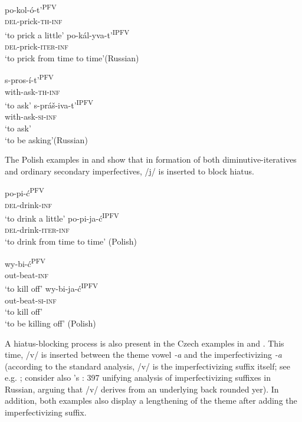 \documentclass[output=paper,colorlinks,citecolor=brown]{langscibook}
\begin{document}
\ea\label{biskup:ex:dimin-rus1}\ea\gll po-kol-ó-t'\textsuperscript{PFV}\\
\textsc{del}-prick-\textsc{th-inf}\\
\glt ‘to prick a little’ \label{biskup:ex:dimin-rus1.a}
\ex\gll po-kál-yva-t'\textsuperscript{IPFV}\\
\textsc{del}-prick-\textsc{iter-inf}\\
\glt ‘to prick from time to time’\hfill (Russian)\label{biskup:ex:dimin-rus1.b}
\z\z

\ea\label{biskup:ex:dimin-rus2}\ea\gll s-pros-í-t'\textsuperscript{PFV}\\
with-ask-\textsc{th-inf}\\
\glt ‘to ask’ \label{biskup:ex:dimin-rus2.a}
\ex\gll s-práš-iva-t'\textsuperscript{IPFV}\\
with-ask-\textsc{si-inf}\\
\glt ‘to ask’\\‘to be asking’\hfill (Russian)\label{biskup:ex:dimin-rus2.b}
\z\z

\noindent The Polish examples in  and  show that in formation of both diminutive-iteratives and ordinary secondary imperfectives, /j/ is inserted to block hiatus.

\ea\label{biskup:ex:dimin-pol1}\ea\gll po-pi-ć\textsuperscript{PFV}\\
\textsc{del}-drink-\textsc{inf}\\
\glt ‘to drink a little’ \label{biskup:ex:dimin-pol1.a}
\ex\gll po-pi-ja-ć\textsuperscript{IPFV}\\
\textsc{del}-drink-\textsc{iter-inf}\\
\glt ‘to drink from time to time’ \hfill (Polish) \label{biskup:ex:pol1.b}
\z\z

\ea\label{biskup:ex:dimin-pol2}\ea\gll wy-bi-ć\textsuperscript{PFV}\\
out-beat-\textsc{inf}\\
\glt ‘to kill off’ \label{biskup:ex:dimin-pol2.a}
\ex\gll wy-bi-ja-ć\textsuperscript{IPFV}\\
out-beat-\textsc{si-inf}\\
\glt ‘to kill off’ \\ ‘to be killing off’ \hfill (Polish) \label{biskup:ex:dimin-pol2.b}
\z\z

\noindent A hiatus-blocking process is also present in the Czech examples in  and . This time, /v/ is inserted between the theme vowel \textit{-a} and the imperfectivizing \textit{-a} (according to the standard analysis, /v/ is the imperfectivizing suffix itself; see e.g. \citealt[194]{Karlik.etal1995}; consider also \citeauthor{Matushansky2009}'s \citeyear{Matushansky2009}: 397 unifying analysis of imperfectivizing suffixes in Russian, arguing that /v/ derives from an underlying back rounded yer). In addition, both examples also display a lengthening of the theme after adding the imperfectivizing suffix.
\end{document}
